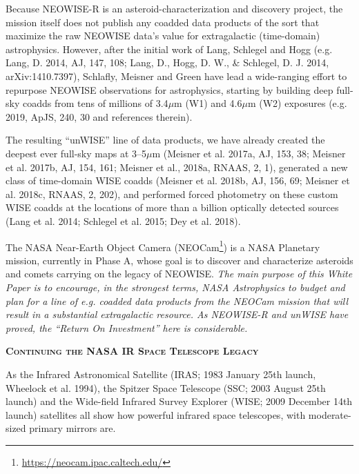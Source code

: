 \documentclass[12pt]{article}
\begin{document}
\smallskip
\noindent
Because NEOWISE-R is an asteroid-characterization and discovery project, the mission itself does not publish any coadded data products of the sort that maximize the raw NEOWISE data’s value for extragalactic (time-domain) astrophysics. However, after the initial work of Lang, Schlegel and Hogg (e.g. Lang, D. 2014, AJ, 147, 108; Lang, D., Hogg, D. W., \& Schlegel, D. J. 2014, arXiv:1410.7397), Schlafly, Meisner and Green have lead a wide-ranging effort to repurpose NEOWISE observations for astrophysics, starting by building deep full-sky coadds from tens of millions of 3.4$\mu$m (W1) and 4.6$\mu$m (W2) exposures (e.g. 2019, ApJS, 240, 30 and references therein). 

\smallskip
\noindent
The resulting ``unWISE'' line of data products, we have already created the deepest ever full-sky maps at 3–5$\mu$m 
(Meisner et al. 2017a, AJ, 153, 38;  
Meisner et al. 2017b, AJ, 154, 161; 
Meisner et al., 2018a, RNAAS, 2, 1), 
generated a new class of time-domain WISE coadds 
(Meisner et al.  2018b, AJ, 156, 69; 
Meisner et al.  2018c, RNAAS, 2, 202), and performed forced photometry on these custom WISE coadds at the locations of more than a billion optically detected sources
 (Lang et al. 2014; Schlegel et al. 2015; Dey et al. 2018).

\smallskip
\noindent
The NASA Near-Earth Object Camera (NEOCam\footnote{\href{https://neocam.ipac.caltech.edu/}{https://neocam.ipac.caltech.edu/}}) is a NASA Planetary mission, currently in Phase A, whose goal is to discover and characterize asteroids and comets carrying on the legacy of NEOWISE.
%
{\it The main purpose of this White Paper is to encourage, in the strongest terms, NASA Astrophysics to 
budget and plan for a line of e.g. coadded data products from the NEOCam mission that will result in a substantial extragalactic resource. As NEOWISE-R and unWISE have proved, the ``Return On Investment'' here is considerable.}


\smallskip
\smallskip
\noindent
{\bfseries \textsc{\textcolor{Cerulean}{Continuing the NASA IR Space Telescope Legacy}}} 

\smallskip
\noindent
As the Infrared Astronomical Satellite (IRAS; 1983 January 25th launch, Wheelock et al. 1994), 
the Spitzer Space Telescope (SSC; 2003 August 25th launch) and the Wide-field
Infrared Survey Explorer (WISE; 2009 December 14th launch) satellites all show 
how powerful infrared space telescopes, with moderate-sized primary mirrors are.
\end{document}
